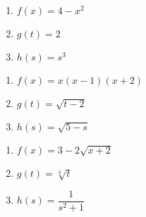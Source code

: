 \begin{multicols}{3}
\begin{enumerate}
\setcounter{enumi}{\value{HW}}

\item $f(x) = 4-x^2$
\item $g(t) = 2$
\item $h(s) = s^3$

\setcounter{HW}{\value{enumi}}
\end{enumerate}
\end{multicols}

\begin{multicols}{3}
\begin{enumerate}
\setcounter{enumi}{\value{HW}}

\item $f(x) = x(x-1)(x+2)$
\item $g(t) = \sqrt{t-2}$
\item $h(s) = \sqrt{5 - s}$

\setcounter{HW}{\value{enumi}}
\end{enumerate}
\end{multicols}

\begin{multicols}{3}
\begin{enumerate}
\setcounter{enumi}{\value{HW}}

\item $f(x) = 3-2\sqrt{x+2}$
\item $g(t) = \sqrt[3]{t}$
\item $h(s) = \dfrac{1}{s^{2} + 1}$ \label{sketchgraphlast}

\setcounter{HW}{\value{enumi}}
\end{enumerate}
\end{multicols}



